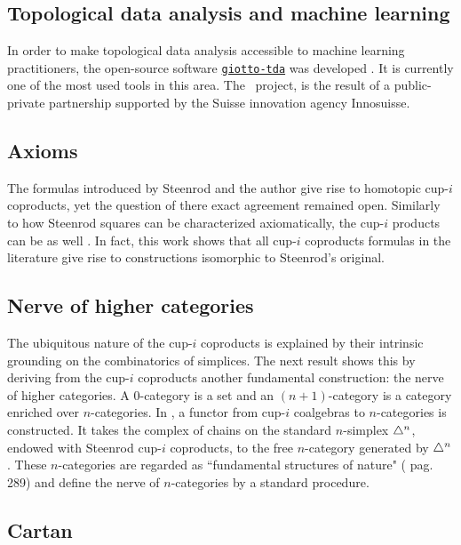 \subsection{Topological data analysis and machine learning} \label{ss:giotto}

In order to make topological data analysis accessible to machine learning practitioners, the open-source software \href{https://giotto-ai.github.io/gtda-docs/latest/library.html}{\texttt{giotto-tda}} was developed \cite{medina2021giotto}.
It is currently one of the most used tools in this area.
The \giottoTDA\ project, is the result of a public-private partnership supported by the Suisse innovation agency Innosuisse.

\subsection{Axioms}

The formulas introduced by Steenrod and the author give rise to homotopic cup-$i$ coproducts, yet the question of there exact agreement remained open.
Similarly to how Steenrod squares can be characterized axiomatically, the cup-$i$ products can be as well \cite{medina2022axiomatic}.
In fact, this work shows that all cup-$i$ coproducts formulas in the literature give rise to constructions isomorphic to Steenrod's original.

\subsection{Nerve of higher categories} \label{ss:nerve}

The ubiquitous nature of the cup-$i$ coproducts is explained by their intrinsic grounding on the combinatorics of simplices.
The next result shows this by deriving from the cup-$i$ coproducts another fundamental construction: the nerve of higher categories.
A $0$-category is a set and an $(n+1)$-category is a category enriched over $n$-categories.
In \cite{medina2020globular}, a functor from cup-$i$ coalgebras to $n$-categories is constructed.
It takes the complex of chains on the standard $n$-simplex $\triangle^n$, endowed with Steenrod cup-$i$ coproducts, to the free $n$-category generated by $\triangle^n$.
These $n$-categories are regarded as ``fundamental structures of nature" (\cite{street1987orientals} pag. 289) and define the nerve of $n$-categories by a standard procedure.

\subsection{Cartan} \label{ss:cartan}

